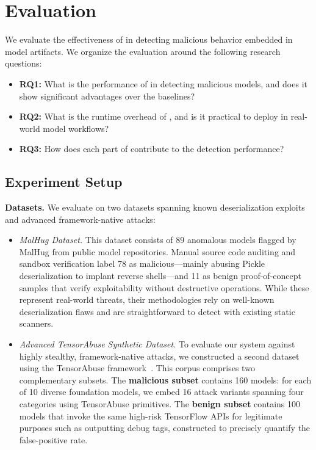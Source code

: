 \section{Evaluation}\label{sec:evaluation}

We evaluate the effectiveness of \toolname{} in detecting malicious behavior embedded in model artifacts. We organize the evaluation around the following research questions:

\begin{itemize}[noitemsep, topsep=1pt, partopsep=1pt, listparindent=\parindent, leftmargin=*]
    \item \textbf{RQ1:} What is the performance of \toolname{} in detecting malicious models, and does it show significant advantages over the baselines?
    \item \textbf{RQ2:} What is the runtime overhead of \toolname{}, and is it practical to deploy in real-world model workflows?
    \item \textbf{RQ3:} How does each part of \toolname{} contribute to the detection performance?
\end{itemize}


\subsection{Experiment Setup}

\noindent \textbf{Datasets.}
We evaluate \toolname{} on two datasets spanning known deserialization exploits and advanced framework-native attacks:
\begin{itemize}
    \item \emph{MalHug Dataset.} This dataset consists of 89 anomalous models flagged by MalHug from public model repositories\cite{malhug}.  Manual source code auditing and sandbox verification label 78 as malicious—mainly abusing Pickle deserialization to implant reverse shells—and 11 as benign proof-of-concept samples that verify exploitability without destructive operations. While these represent real-world threats, their methodologies rely on well-known deserialization flaws and are straightforward to detect with existing static scanners.
    \item \emph{Advanced TensorAbuse Synthetic Dataset.} To evaluate our system against highly stealthy, framework-native attacks, we constructed a second dataset using the TensorAbuse framework~\cite{zhu2025}. This corpus comprises two complementary subsets. The \textbf{malicious subset} contains 160 models: for each of 10 diverse foundation models, we embed 16 attack variants spanning four categories using TensorAbuse primitives.  The \textbf{benign subset} contains 100 models that invoke the same high-risk TensorFlow APIs for legitimate purposes such as outputting debug tags, constructed to precisely quantify the false-positive rate. 
\end{itemize}

